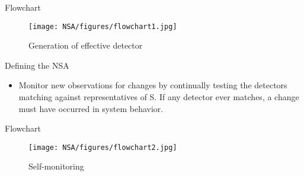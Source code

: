 \begin{frame}{Flowchart}
  \begin{figure}[hb]
  \centering
  \texttt{[image: NSA/figures/flowchart1.jpg]}
  \caption{Generation of effective detector}
  \end{figure}
\end{frame}

\begin{frame}{Defining the NSA}
  \begin{itemize}
  \item {
    Monitor new observations for changes by continually testing the detectors matching against representatives of S.  If any detector ever matches, a change must have occurred in system behavior.
  }
  \end{itemize}
\end{frame}

\begin{frame}{Flowchart}
  \begin{figure}[hb]
  \centering
  \texttt{[image: NSA/figures/flowchart2.jpg]}
  \caption{Self-monitoring}
  \end{figure}
\end{frame}

